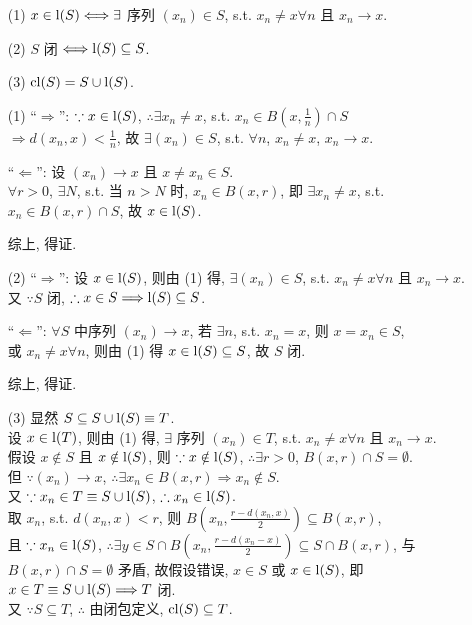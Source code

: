\documentclass{note}
\begin{document}
\begin{thm}[(课本定理 12.3)]
    \begin{itemize}
        \item[(1)] $x\in\operatorname{l}(S)\Longleftrightarrow\exists$ 序列 $(x_n)\in S$, s.t. $x_n\neq x\forall n$ 且 $x_n\rightarrow x$.
        \item[(2)] $S$ 闭 $\Longleftrightarrow\operatorname{l}(S)\subseteq S$.
        \item[(3)] $\operatorname{cl}(S)=S\cup\operatorname{l}(S)$.
    \end{itemize}
\end{thm}
\begin{pf}
    \begin{itemize}
        \item[(1)] ``$\Longrightarrow$'': $\because x\in\operatorname{l}(S)$, $\therefore\exists x_n\neq x$, s.t. $x_n\in B\left(x,\frac{1}{n}\right)\cap S$\\
        $\Longrightarrow d(x_n,x)<\frac{1}{n}$, 故 $\exists(x_n)\in S$, s.t. $\forall n$, $x_n\neq x$, $x_n\rightarrow x$.

        ``$\Longleftarrow$'': 设 $(x_n)\rightarrow x$ 且 $x\neq x_n\in S$.\\
        $\forall r>0$, $\exists N$, s.t. 当 $n>N$ 时, $x_n\in B(x,r)$, 即 $\exists x_n\neq x$, s.t. $x_n\in B(x,r)\cap S$, 故 $x\in\operatorname{l}(S)$.

        综上, 得证.
        \item[(2)] ``$\Longrightarrow$'': 设 $x\in\operatorname{l}(S)$, 则由 (1) 得, $\exists(x_n)\in S$, s.t. $x_n\neq x\forall n$ 且 $x_n\rightarrow x$.\\
        又 $\because S$ 闭, $\therefore x\in S\Longrightarrow\operatorname{l}(S)\subseteq S$.

        ``$\Longleftarrow$'': $\forall S$ 中序列 $(x_n)\rightarrow x$, 若 $\exists n$, s.t. $x_n=x$, 则 $x=x_n\in S$,\\
        或 $x_n\neq x\forall n$, 则由 (1) 得 $x\in\operatorname{l}(S)\subseteq S$, 故 $S$ 闭.

        综上, 得证.
        \item[(3)] 显然 $S\subseteq S\cup\operatorname{l}(S)\equiv T$.\\
        设 $x\in\operatorname{l}(T)$, 则由 (1) 得, $\exists$ 序列 $(x_n)\in T$, s.t. $x_n\neq x\forall n$ 且 $x_n\rightarrow x$.\\
        假设 $x\notin S$ 且 $x\notin\operatorname{l}(S)$, 则 $\because x\notin\operatorname{l}(S)$, $\therefore\exists r>0$, $B(x,r)\cap S=\emptyset$.\\
        但 $\because(x_n)\rightarrow x$, $\therefore\exists x_n\in B(x,r)\Longrightarrow x_n\notin S$.\\
        又 $\because x_n\in T\equiv S\cup\operatorname{l}(S)$, $\therefore x_n\in\operatorname{l}(S)$.\\
        取 $x_n$, s.t. $d(x_n,x)<r$, 则 $B\left(x_n,\frac{r-d(x_n,x)}{2}\right)\subseteq B(x,r)$,\\
        且 $\because x_n\in\operatorname{l}(S)$, $\therefore\exists y\in S\cap B\left(x_n,\frac{r-d(x_n-x)}{2}\right)\subseteq S\cap B(x,r)$, 与 $B(x,r)\cap S=\emptyset$ 矛盾, 故假设错误, $x\in S$ 或 $x\in\operatorname{l}(S)$, 即 $x\in T\equiv S\cup \operatorname{l}(S)\Longrightarrow T$ 闭.\\
        又 $\because S\subseteq T$, $\therefore$ 由闭包定义, $\operatorname{cl}(S)\subseteq T$.


\end{itemize}
\end{pf}
\end{document}
